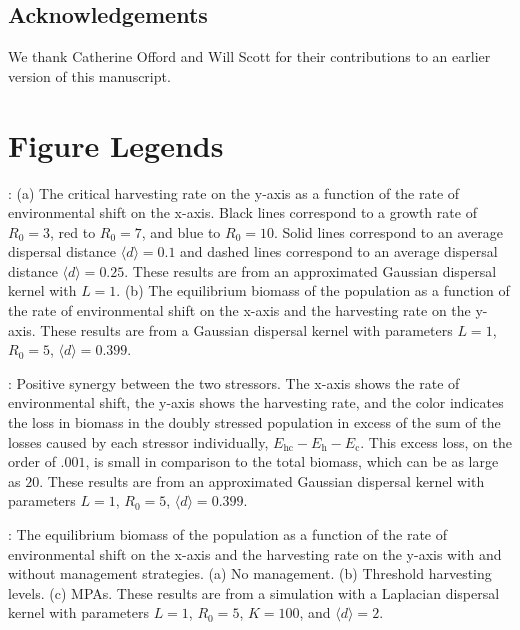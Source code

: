 \documentclass[12pt,english]{article}
\begin{document}
\begin{spacing}{1.9}
\begin{flushleft}
\section*{ Acknowledgements}
We thank Catherine Offord and Will Scott for their contributions to an earlier version of this manuscript. 

\end{flushleft}



\pagebreak

\section*{Figure Legends}

: (a) The critical harvesting rate on the y-axis as a function of the rate of environmental shift on the x-axis.  Black lines correspond to a growth rate of $R_0=3$, red to $R_0=7$, and blue to $R_0=10$.  Solid lines correspond to an average dispersal distance $\langle d \rangle =0.1$ and dashed lines correspond to an average dispersal distance $\langle d \rangle =0.25$.  These results are from an approximated Gaussian dispersal kernel with $L=1$.  (b) 
The equilibrium biomass of the population as a function of the rate of environmental shift on the x-axis and the harvesting rate on the y-axis. These results are from a Gaussian dispersal kernel with parameters $L=1$, $R_0=5$, $\langle d \rangle = 0.399$. 
\hspace{6in}
\hspace{6in}

: Positive synergy between the two stressors.  The x-axis shows the rate of environmental shift, the y-axis shows the harvesting rate, and the color indicates the loss in biomass in the doubly stressed population in excess of the sum of the losses caused by each stressor individually, $E_\text{hc}-E_\text{h}-E_\text{c}$.  This excess loss, on the order of $.001$, is small in comparison to the total biomass, which can be as large as $20$.  These results are from an approximated Gaussian dispersal kernel with parameters $L=1$, $R_0=5$, $\langle d \rangle = 0.399$.
\hspace{6in}
\hspace{6in}

: The equilibrium biomass of the population as a function of the rate of environmental shift on the x-axis and the harvesting rate on the y-axis with and without management strategies.  (a) No management.  (b) Threshold harvesting levels.  (c) MPAs.  These results are from a simulation with a Laplacian dispersal kernel with parameters $L=1$, $R_0=5$, $K=100$, and $\langle d \rangle =2$.
\pagebreak


\end{spacing}
\end{document}
